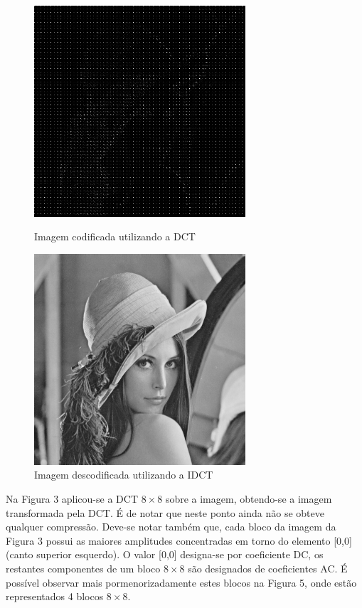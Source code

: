 \documentclass[12pt,a4paper]{article}
\begin{document}
\begin{figure}[h]
	\centering
    \begin{minipage}{0.45\textwidth}
        \centering
        \includegraphics[width=0.7\textwidth]{imagens/dct.jpg}
        \caption{Imagem codificada utilizando a DCT}
    \end{minipage}\hfill
    \begin{minipage}{0.45\textwidth}
        \centering
        \includegraphics[width=0.7\textwidth]{imagens/idct.jpg}
        \caption{Imagem descodificada utilizando a IDCT}
    \end{minipage}
\end{figure}

Na Figura 3 aplicou-se a DCT $8\times 8$ sobre a imagem, obtendo-se a imagem transformada pela DCT. É de notar que neste ponto ainda não se obteve qualquer compressão. Deve-se notar também que, cada bloco da imagem da Figura 3 possui as maiores amplitudes concentradas em torno do elemento [0,0](canto superior esquerdo). O valor [0,0] designa-se por coeficiente DC, os restantes componentes de um bloco $8\times 8$ são designados de coeficientes AC. É possível observar mais pormenorizadamente estes blocos na Figura 5, onde estão representados 4 blocos $8\times 8$.
\end{document}
